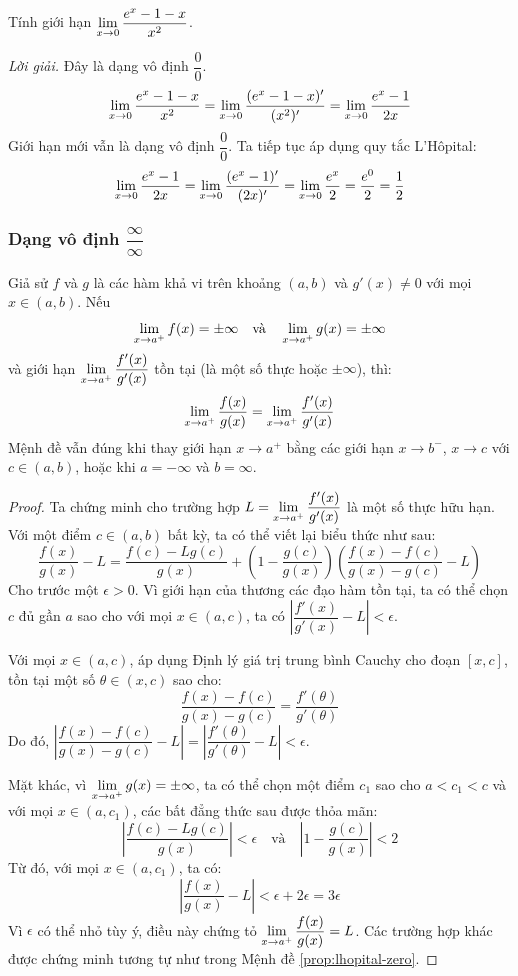 \begin{example}
Tính giới hạn $\lim\limits_{x \to 0} \dfrac{e^x - 1 - x}{x^2}$.

\textit{Lời giải.}
Đây là dạng vô định $\dfrac{0}{0}$.
$$ \lim\limits_{x \to 0} \dfrac{e^x - 1 - x}{x^2} = \lim\limits_{x \to 0} \dfrac{(e^x - 1 - x)'}{(x^2)'} = \lim\limits_{x \to 0} \dfrac{e^x - 1}{2x} $$
Giới hạn mới vẫn là dạng vô định $\dfrac{0}{0}$. Ta tiếp tục áp dụng quy tắc L'Hôpital:
$$ \lim\limits_{x \to 0} \dfrac{e^x - 1}{2x} = \lim\limits_{x \to 0} \dfrac{(e^x - 1)'}{(2x)'} = \lim\limits_{x \to 0} \dfrac{e^x}{2} = \dfrac{e^0}{2} = \dfrac{1}{2} $$
\end{example}

\subsubsection*{Dạng vô định \texorpdfstring{$\dfrac{\infty}{\infty}$}{\textinfty/\textinfty}}

\begin{proposition}
\label{prop:lhopital-inf}
Giả sử $f$ và $g$ là các hàm khả vi trên khoảng $(a, b)$ và $g'(x) \neq 0$ với mọi $x \in (a, b)$. Nếu
$$ \lim\limits_{x \to a^+} f(x) = \pm\infty \quad \text{và} \quad \lim\limits_{x \to a^+} g(x) = \pm\infty $$
và giới hạn $\lim\limits_{x \to a^+} \dfrac{f'(x)}{g'(x)}$ tồn tại (là một số thực hoặc $\pm\infty$), thì:
$$ \lim\limits_{x \to a^+} \dfrac{f(x)}{g(x)} = \lim\limits_{x \to a^+} \dfrac{f'(x)}{g'(x)} $$
Mệnh đề vẫn đúng khi thay giới hạn $x \to a^+$ bằng các giới hạn $x \to b^-$, $x \to c$ với $c \in (a,b)$, hoặc khi $a = -\infty$ và $b = \infty$.
\end{proposition}

\begin{proof}
Ta chứng minh cho trường hợp $L = \lim\limits_{x \to a^+} \dfrac{f'(x)}{g'(x)}$ là một số thực hữu hạn.
Với một điểm $c \in (a,b)$ bất kỳ, ta có thể viết lại biểu thức như sau:
$$ \dfrac{f(x)}{g(x)} - L = \dfrac{f(c) - Lg(c)}{g(x)} + \left(1 - \dfrac{g(c)}{g(x)}\right) \left(\dfrac{f(x) - f(c)}{g(x) - g(c)} - L\right) $$
Cho trước một $\epsilon > 0$. Vì giới hạn của thương các đạo hàm tồn tại, ta có thể chọn $c$ đủ gần $a$ sao cho với mọi $x \in (a,c)$, ta có $\left|\dfrac{f'(x)}{g'(x)} - L\right| < \epsilon$.

Với mọi $x \in (a,c)$, áp dụng Định lý giá trị trung bình Cauchy cho đoạn $[x, c]$, tồn tại một số $\theta \in (x, c)$ sao cho:
$$ \dfrac{f(x) - f(c)}{g(x) - g(c)} = \dfrac{f'(\theta)}{g'(\theta)} $$
Do đó, $\left|\dfrac{f(x) - f(c)}{g(x) - g(c)} - L\right| = \left|\dfrac{f'(\theta)}{g'(\theta)} - L\right| < \epsilon$.

Mặt khác, vì $\lim\limits_{x \to a^+} g(x) = \pm\infty$, ta có thể chọn một điểm $c_1$ sao cho $a < c_1 < c$ và với mọi $x \in (a, c_1)$, các bất đẳng thức sau được thỏa mãn:
$$ \left|\dfrac{f(c) - Lg(c)}{g(x)}\right| < \epsilon \quad \text{và} \quad \left|1 - \dfrac{g(c)}{g(x)}\right| < 2 $$
Từ đó, với mọi $x \in (a, c_1)$, ta có:
$$ \left|\dfrac{f(x)}{g(x)} - L\right| < \epsilon + 2\epsilon = 3\epsilon $$
Vì $\epsilon$ có thể nhỏ tùy ý, điều này chứng tỏ $\lim\limits_{x \to a^+} \dfrac{f(x)}{g(x)} = L$. Các trường hợp khác được chứng minh tương tự như trong Mệnh đề \ref{prop:lhopital-zero}.
\end{proof}

